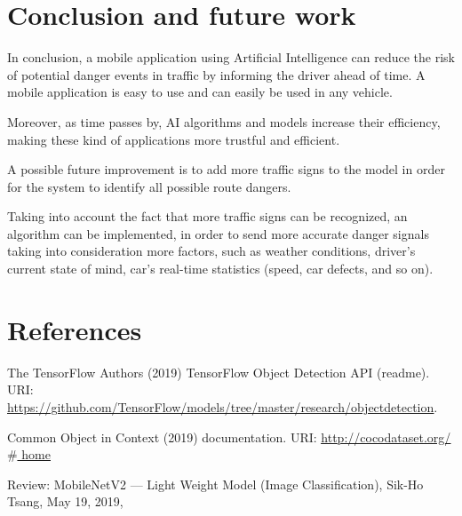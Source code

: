 \documentclass[12pt]{report}
\renewcommand{\_}{\kern-1.5pt\textunderscore\kern-1.5pt}
\begin{document}
\chapter{Conclusion and future work}
In conclusion, a mobile application using Artificial Intelligence can reduce the risk of potential danger events in traffic by informing the driver ahead of time. A mobile application is easy to use and can easily be used in any vehicle.\par

Moreover, as time passes by, AI algorithms and models increase their efficiency, making these kind of applications more trustful and efficient.\par

A possible future improvement is to add more traffic signs to the model in order for the system to identify all possible route dangers.\par

Taking into account the fact that more traffic signs can be recognized, an algorithm can be implemented, in order to send more accurate danger signals taking into consideration more factors, such as weather conditions, driver’s current state of mind, car’s real-time statistics (speed, car defects, and so on).\par

\par

\chapter{References}

\begin{justify}
[1] The TensorFlow Authors (2019) TensorFlow Object Detection API (readme). URI: \href{https://github.com/TensorFlow/models/tree/master/research/object_detection}{\textcolor[HTML]{1155CC}{\ul{https://github.com/TensorFlow/models/tree/master/research/object\_detection}}}.
\end{justify}\par


\vspace{\baselineskip}
\begin{justify}
[2] Common Object in Context (2019) documentation. URI: \href{http://cocodataset.org/#home}{\textcolor[HTML]{1155CC}{\ul{http://cocodataset.org/$\#$ home}}}
\end{justify}\par


\vspace{\baselineskip}
\begin{justify}
[3] Review: MobileNetV2 — Light Weight Model (Image Classification), Sik-Ho Tsang, May 19, 2019, 
\end{justify}\par
\end{document}
